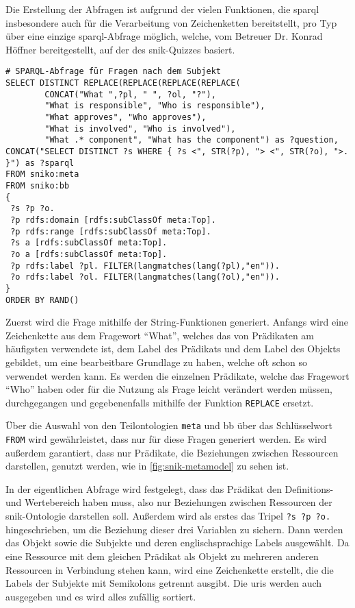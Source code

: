 Die Erstellung der Abfragen ist aufgrund der vielen Funktionen, die \ac{sparql} insbesondere auch für die Verarbeitung von Zeichenketten bereitstellt, pro Typ über eine einzige \ac{sparql}-Abfrage möglich,
welche, vom Betreuer Dr. Konrad Höffner bereitgestellt, auf der des \ac{snik}-Quizzes basiert.

\begin{lstlisting}[language=SPARQL]
# SPARQL-Abfrage für Fragen nach dem Subjekt
SELECT DISTINCT REPLACE(REPLACE(REPLACE(REPLACE(
        CONCAT("What ",?pl, " ", ?ol, "?"),
        "What is responsible", "Who is responsible"),
        "What approves", "Who approves"),
        "What is involved", "Who is involved"),
        "What .* component", "What has the component") as ?question,
CONCAT("SELECT DISTINCT ?s WHERE { ?s <", STR(?p), "> <", STR(?o), ">. }") as ?sparql
FROM sniko:meta
FROM sniko:bb
{
 ?s ?p ?o.
 ?p rdfs:domain [rdfs:subClassOf meta:Top].
 ?p rdfs:range [rdfs:subClassOf meta:Top].
 ?s a [rdfs:subClassOf meta:Top].
 ?o a [rdfs:subClassOf meta:Top].
 ?p rdfs:label ?pl. FILTER(langmatches(lang(?pl),"en")).
 ?o rdfs:label ?ol. FILTER(langmatches(lang(?ol),"en")).
}
ORDER BY RAND()
\end{lstlisting}

Zuerst wird die Frage mithilfe der String-Funktionen generiert.
Anfangs wird eine Zeichenkette aus dem Fragewort \enquote{What}, welches das von Prädikaten am häufigsten verwendete ist, dem Label des Prädikats und dem Label des Objekts gebildet,
um eine bearbeitbare Grundlage zu haben, welche oft schon so verwendet werden kann.
Es werden die einzelnen Prädikate, welche das Fragewort \enquote{Who} haben oder für die Nutzung als Frage leicht verändert werden müssen,
durchgegangen und gegebenenfalls mithilfe der Funktion \texttt{REPLACE} ersetzt.

Über die Auswahl von den Teilontologien \texttt{meta} und {bb} über das Schlüsselwort \texttt{FROM} wird gewährleistet, dass nur für diese Fragen generiert werden.
Es wird außerdem garantiert, dass nur Prädikate, die Beziehungen zwischen Ressourcen darstellen, genutzt werden, wie in \cref{fig:snik-metamodel} zu sehen ist.

In der eigentlichen Abfrage wird festgelegt, dass das Prädikat den Definitions- und Wertebereich   haben muss, also nur Beziehungen zwischen Ressourcen der \ac{snik}-Ontologie darstellen soll.
Außerdem wird als erstes das Tripel \texttt{?s ?p ?o.} hingeschrieben, um die Beziehung dieser drei Variablen zu sichern.
Dann werden das Objekt sowie die Subjekte und deren englischsprachige Labels ausgewählt.
Da eine Ressource mit dem gleichen Prädikat als Objekt zu mehreren anderen Ressourcen in Verbindung stehen kann, wird eine Zeichenkette erstellt, die die Labels der Subjekte mit Semikolons getrennt ausgibt.
Die \acp{uri} werden auch ausgegeben und es wird alles zufällig sortiert.

